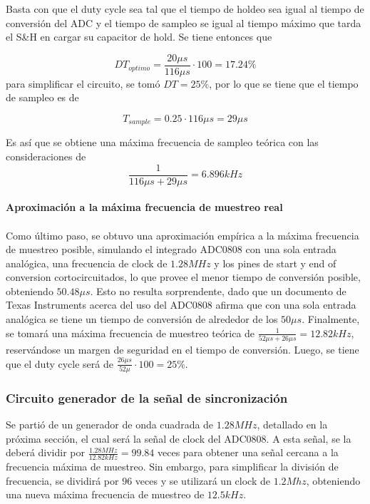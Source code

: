 Basta con que el duty cycle sea tal que el tiempo de holdeo sea igual al tiempo de conversión del ADC y el tiempo de sampleo se igual al tiempo máximo que tarda el S\&H en cargar su capacitor de hold. Se tiene entonces que

\begin{equation}
DT_{optimo} = \frac{20\mu s}{116\mu s}\cdot 100 = 17.24\% 
\end{equation}
para simplificar el circuito, se tomó $DT = 25\%$, por lo que se tiene que el tiempo de sampleo es de

\begin{equation}
T_{sample} = 0.25 \cdot 116\mu s = 29\mu s 
\end{equation}

Es así que se obtiene una máxima frecuencia de sampleo teórica con las consideraciones de 
$$\frac{1}{116\mu s + 29\mu s} = 6.896kHz$$
\\
\textbf{Aproximación a la máxima frecuencia de muestreo real}\\
\\
Como último paso, se obtuvo una aproximación empírica a la máxima frecuencia de muestreo posible, simulando el integrado ADC0808 con una sola entrada analógica, una frecuencia de clock de $1.28MHz$ y los pines de start y end of conversion cortocircuitados, lo que provee el menor tiempo de conversión posible, obteniendo $50.48\mu s$. Esto no resulta sorprendente, dado que un documento de Texas Instruments acerca del uso del ADC0808 afirma que con una sola entrada analógica se tiene un tiempo de conversión de alrededor de los $50\mu s$.
Finalmente, se tomará una máxima frecuencia de muestreo teórica de $\frac{1}{52\mu s + 26\mu s} = 12.82kHz$, reservándose un margen de seguridad en el tiempo de conversión. Luego, se tiene que el duty cycle será de $\frac{26\mu s}{52\mu}\cdot 100 = 25\%$.

\subsubsection{Circuito generador de la señal de sincronización}

Se partió de un generador de onda cuadrada de $1.28 MHz$, detallado en la próxima sección, el cual será la señal de clock del ADC0808. A esta señal, se la deberá dividir por $\frac{1.28MHz}{12.82kHz} = 99.84$ veces para obtener una señal cercana a la frecuencia máxima de muestreo. Sin embargo, para simplificar la división de frecuencia, se dividirá por $96$ veces y se utilizará un clock de $1.2Mhz$, obteniendo una nueva máxima frecuencia de muestreo de $12.5kHz$.

